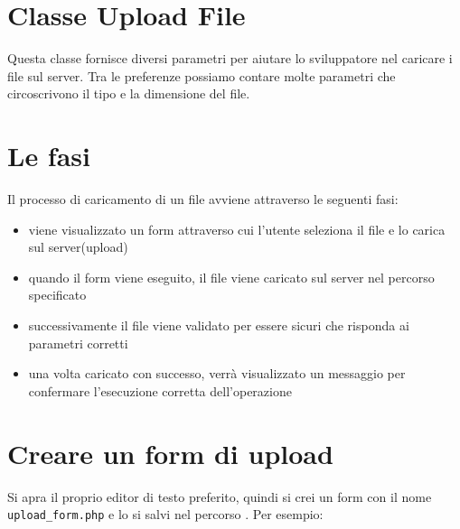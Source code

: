 \section{Classe Upload File}
\label{class:upload}

Questa classe fornisce diversi parametri per aiutare lo sviluppatore nel caricare i file sul server. Tra le preferenze possiamo contare molte parametri che circoscrivono il tipo e la dimensione del file.

\section*{Le fasi}
Il processo di caricamento di un file avviene attraverso le seguenti fasi:

\begin{itemize}
\item viene visualizzato un form attraverso cui l'utente seleziona il file e lo carica sul server(upload)
\item quando il form viene eseguito, il file viene caricato sul server nel percorso specificato
\item successivamente il file viene validato per essere sicuri che risponda ai parametri corretti
\item una volta caricato con successo, verrà visualizzato un messaggio per confermare l'esecuzione corretta dell'operazione
\end{itemize}

\section*{Creare un form di upload}
Si apra il proprio editor di testo preferito, quindi si crei un form con il nome \verb|upload_form.php| e lo si salvi nel percorso . Per esempio:


